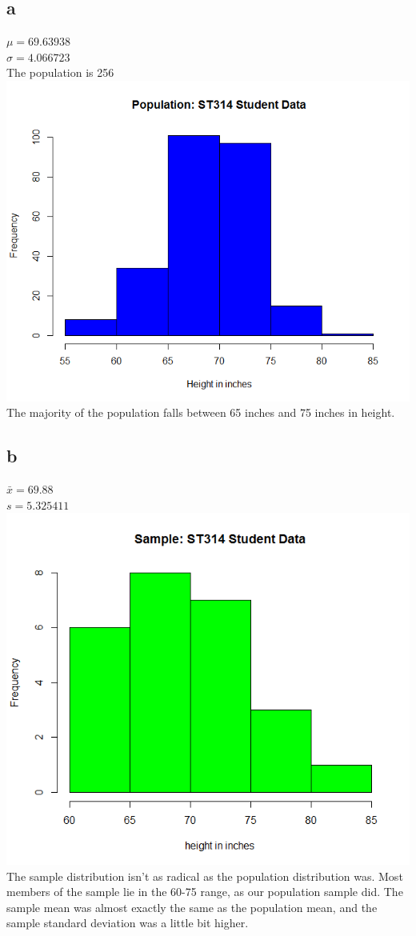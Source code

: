 \documentclass[10pt,letterpaper]{article}
\begin{document}
\subsection*{a}
$\mu = 69.63938$\\
$\sigma = 4.066723$\\
The population is 256\\
\includegraphics[scale=.5]{student-hist}\\
The majority of the population falls between 65 inches and 75 inches in height.
\subsection*{b}
$\bar{x}=69.88$\\
$s=5.325411$\\
\includegraphics[scale=.5]{sample-student-hist}\\
The sample distribution isn't as radical as the population distribution was.
Most members of the sample lie in the 60-75 range, as our population sample 
did. The sample mean was almost exactly the same as the population mean, and
the sample standard deviation was a little bit higher.
\end{document}
